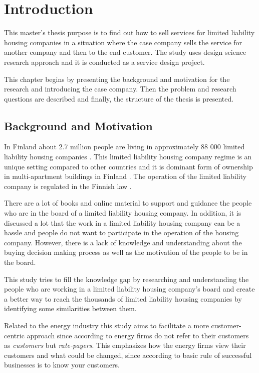 \chapter{Introduction}
\label{chapter:intro}

This master's thesis purpose is to find out how to sell services for limited liability housing companies in a situation where the case company sells the service for another company and then to the end customer. The study uses design science research approach and it is conducted as a service design project.

This chapter begins by presenting the background and motivation for the research and introducing the case company. Then the problem and research questions are described and finally, the structure of the thesis is presented.

\section{Background and Motivation}

In Finland about 2.7 million people are living in approximately 88 000 limited liability housing companies \parencite{REMF, Stats}. This limited liability housing company regime is an unique setting compared to other countries and it is dominant form of ownership in multi-apartment buildings in Finland \parencite{Lujanen:2017}. The operation of the limited liability company is regulated in the Finnish law \parencite{YIT}.

There are a lot of books and online material to support and guidance the people who are in the board of a limited liability housing company. In addition, it is discussed a lot that the work in a limited liability housing company can be a hassle and people do not want to participate in the operation of the housing company. However, there is a lack of knowledge and understanding about the buying decision making process as well as the motivation of the people to be in the board.

This study tries to fill the knowledge gap by researching and understanding the people who are working in a limited liability housing company's board and create a better way to reach the thousands of limited liability housing companies by identifying some similarities between them.

Related to the energy industry this study aims to facilitate a more customer-centric approach since according to \textcite{Fader:2012} energy firms do not refer to their customers as \emph{customers} but \emph{rate-payers}. This emphasizes how the energy firms view their customers and what could be changed, since according to \textcite{ByerPersonas:2015} basic rule of successful businesses is to know your customers.

